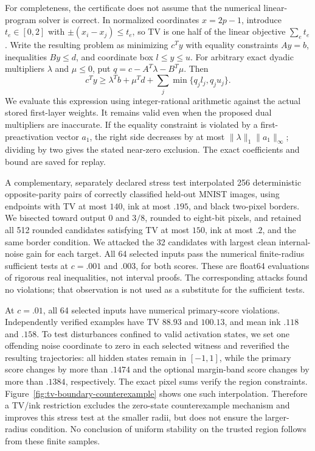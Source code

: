 For completeness, the certificate does not assume that the numerical linear-program solver is correct.  In normalized coordinates $x=2p-1$, introduce $t_e\in[0,2]$ with $\pm(x_i-x_j)\le t_e$, so TV is one half of the linear objective $\sum_e t_e$.  Write the resulting problem as minimizing $c^Ty$ with equality constraints $Ay=b$, inequalities $By\le d$, and coordinate box $l\le y\le u$.  For arbitrary exact dyadic multipliers $\lambda$ and $\mu\le0$, put $q=c-A^T\lambda-B^T\mu$.  Then
\[
 c^Ty\ge \lambda^Tb+\mu^Td+
       \sum_j\min\{q_jl_j,q_ju_j\}.
\]
We evaluate this expression using integer-rational arithmetic against the actual stored first-layer weights.  It remains valid even when the proposed dual multipliers are inaccurate.  If the equality constraint is violated by a first-preactivation vector $a_1$, the right side decreases by at most $\|\lambda\|_1\|a_1\|_\infty$; dividing by two gives the stated near-zero exclusion.  The exact coefficients and bound are saved for replay.

A complementary, separately declared stress test interpolated 256 deterministic opposite-parity pairs of correctly classified held-out MNIST images, using endpoints with TV at most $140$, ink at most $.195$, and black two-pixel borders.  We bisected toward output $0$ and $3/8$, rounded to eight-bit pixels, and retained all 512 rounded candidates satisfying TV at most $150$, ink at most $.2$, and the same border condition.  We attacked the 32 candidates with largest clean internal-noise gain for each target.  All 64 selected inputs pass the numerical finite-radius sufficient tests at $c=.001$ and $.003$, for both scores.  These are float64 evaluations of rigorous real inequalities, not interval proofs.  The corresponding attacks found no violations; that observation is not used as a substitute for the sufficient tests.

At $c=.01$, all 64 selected inputs have numerical primary-score violations.  Independently verified examples have TV $88.93$ and $100.13$, and mean ink $.118$ and $.158$.  To test disturbances confined to valid activation states, we set one offending noise coordinate to zero in each selected witness and reverified the resulting trajectories: all hidden states remain in $[-1,1]$, while the primary score changes by more than $.1474$ and the optional margin-band score changes by more than $.1384$, respectively.  The exact pixel sums verify the region constraints.  Figure~\ref{fig:tv-boundary-counterexample} shows one such interpolation.  Therefore a TV/ink restriction excludes the zero-state counterexample mechanism and improves this stress test at the smaller radii, but does not ensure the larger-radius condition.  No conclusion of uniform stability on the trusted region follows from these finite samples.

